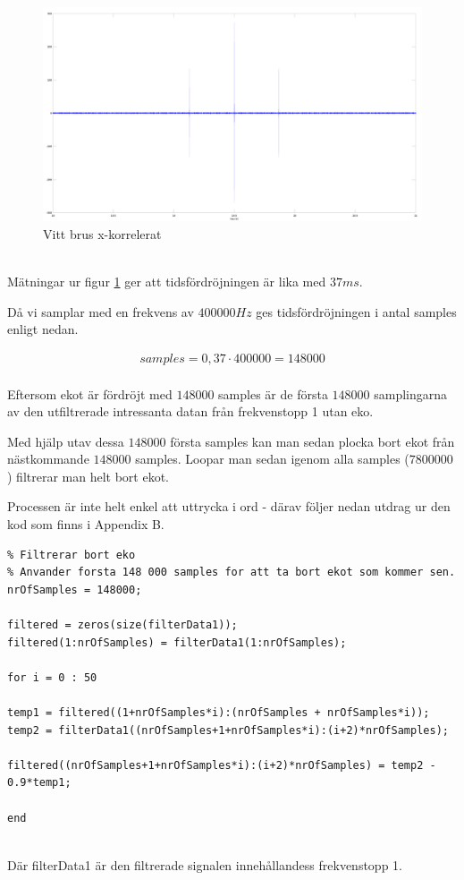 \documentclass[a4paper,12pt,fleqn]{article}
\begin{document}
\begin{figure}[htp]
  \begin{center}
  \includegraphics[keepaspectratio=true,width=\linewidth]{xCorr.png}  %
  \end{center}
  \caption{Vitt brus x-korrelerat} %
  \label{fig:xCorr}
\end{figure}
~\\
Mätningar ur figur \ref{fig:xCorr} ger att tidsfördröjningen är lika med $37 ms$. 

Då vi samplar med en frekvens av $400 000 Hz$ ges tidsfördröjningen i antal samples enligt nedan. 

\begin{gather}
samples = 0,37 \cdot 400 000 = 148 000
\label{equ:delaySamples}
\end{gather}
~\\
Eftersom ekot är fördröjt med $148 000$ samples är de första $148 000$ samplingarna av den utfiltrerade intressanta datan från frekvenstopp 1 utan eko. 

Med hjälp utav dessa $148 000$ första samples kan man sedan plocka bort ekot från nästkommande $148 000$ samples. Loopar man sedan igenom alla samples ($7 800 000$) filtrerar man helt bort ekot. 

Processen är inte helt enkel att uttrycka i ord - därav följer nedan utdrag ur den kod som finns i Appendix B. 

\begin{lstlisting}
% Filtrerar bort eko
% Anvander forsta 148 000 samples for att ta bort ekot som kommer sen.
nrOfSamples = 148000;

filtered = zeros(size(filterData1));
filtered(1:nrOfSamples) = filterData1(1:nrOfSamples);

for i = 0 : 50

temp1 = filtered((1+nrOfSamples*i):(nrOfSamples + nrOfSamples*i));
temp2 = filterData1((nrOfSamples+1+nrOfSamples*i):(i+2)*nrOfSamples);

filtered((nrOfSamples+1+nrOfSamples*i):(i+2)*nrOfSamples) = temp2 - 0.9*temp1;

end
\end{lstlisting}
~\\
Där filterData1 är den filtrerade signalen innehållandess frekvenstopp 1. 
\end{document}
